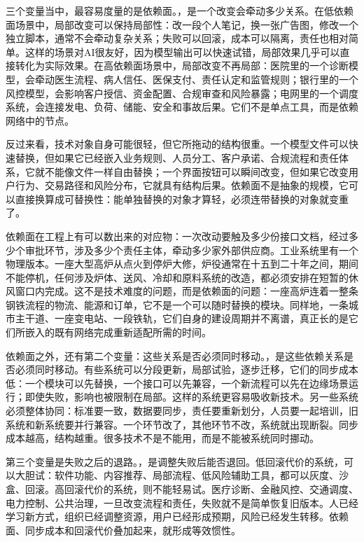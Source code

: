 
三个变量当中，最容易度量的是依赖面。，是一个改变会牵动多少关系。在低依赖面场景中，局部改变可以保持局部性：改一段个人笔记，换一张广告图，修改一个独立脚本，通常不会牵动复杂关系；失败可以回滚，成本可以隔离，责任也相对简单。这样的场景对AI很友好，因为模型输出可以快速试错，局部效果几乎可以直接转化为实际效果。在高依赖面场景中，局部改变不再局部：医院里的一个诊断模型，会牵动医生流程、病人信任、医保支付、责任认定和监管规则；银行里的一个风控模型，会影响客户授信、资金配置、合规审查和风险暴露；电网里的一个调度系统，会连接发电、负荷、储能、安全和事故后果。它们不是单点工具，而是依赖网络中的节点。

反过来看，技术对象自身可能很轻，但它所拖动的结构很重。一个模型文件可以快速替换，但如果它已经嵌入业务规则、人员分工、客户承诺、合规流程和责任体系，它就不能像文件一样自由替换；一个界面按钮可以瞬间改变，但如果它改变用户行为、交易路径和风险分布，它就具有结构后果。依赖面不是抽象的规模，它可以直接换算成可替换性：能单独替换的对象才算轻，必须连带替换的对象就变重了。

依赖面在工程上有可以数出来的对应物：一次改动要触及多少份接口文档，经过多少个审批环节，涉及多少个责任主体，牵动多少家外部供应商。工业系统里有一个物理版本。一座大型高炉从点火到停炉大修，炉役通常在十五到二十年之间，期间不能停机，任何涉及炉体、送风、冷却和原料系统的改造，都必须安排在短暂的休风窗口内完成\cite{dong2022operational}。这不是技术难度的问题，而是依赖面的问题：一座高炉连着一整条钢铁流程的物流、能源和订单，它不是一个可以随时替换的模块。同样地，一条城市主干道、一座变电站、一段铁轨，它们自身的建设周期并不离谱，真正长的是它们所嵌入的既有网络完成重新适配所需的时间。


依赖面之外，还有第二个变量：这些关系是否必须同时移动。，是这些依赖关系是否必须同时移动。有些系统可以分段更新，局部试验，逐步迁移，它们的同步成本低：一个模块可以先替换，一个接口可以先兼容，一个新流程可以先在边缘场景运行；即使失败，影响也被限制在局部。这样的系统更容易吸收新技术。另一些系统必须整体协同：标准要一致，数据要同步，责任要重新划分，人员要一起培训，旧系统和新系统要并行兼容。一个环节改了，其他环节不改，系统就出现断裂。同步成本越高，结构越重。很多技术不是不能用，而是不能被系统同时挪动。

第三个变量是失败之后的退路。，是调整失败后能否退回。低回滚代价的系统，可以大胆试：软件功能、内容推荐、局部流程、低风险辅助工具，都可以灰度、沙盒、回滚。高回滚代价的系统，则不能轻易试。医疗诊断、金融风控、交通调度、电力控制、公共治理，一旦改变流程和责任，失败就不是简单恢复旧版本。人已经学习新方式，组织已经调整资源，用户已经形成预期，风险已经发生转移。依赖面、同步成本和回滚代价叠加起来，就形成等效惯性。

